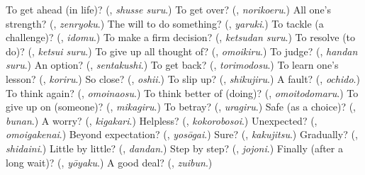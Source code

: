 \begin{tcolorbox}[breakable,colback=teal!4,colframe=teal!35!black,title={Before you move on}]
To get ahead (in life)? (\textbf{}, \emph{shusse suru}.) To get over? (\textbf{}, \emph{norikoeru}.) All one's strength? (\textbf{}, \emph{zenryoku}.) The will to do something? (\textbf{}, \emph{yaruki}.) To tackle (a challenge)? (\textbf{}, \emph{idomu}.) To make a firm decision? (\textbf{}, \emph{ketsudan suru}.) To resolve (to do)? (\textbf{}, \emph{ketsui suru}.) To give up all thought of? (\textbf{}, \emph{omoikiru}.) To judge? (\textbf{}, \emph{handan suru}.) An option? (\textbf{}, \emph{sentakushi}.) To get back? (\textbf{}, \emph{torimodosu}.) To learn one's lesson? (\textbf{}, \emph{koriru}.) So close? (\textbf{}, \emph{oshii}.) To slip up? (\textbf{}, \emph{shikujiru}.) A fault? (\textbf{}, \emph{ochido}.) To think again? (\textbf{}, \emph{omoinaosu}.) To think better of (doing)? (\textbf{}, \emph{omoitodomaru}.) To give up on (someone)? (\textbf{}, \emph{mikagiru}.) To betray? (\textbf{}, \emph{uragiru}.) Safe (as a choice)? (\textbf{}, \emph{bunan}.) A worry? (\textbf{}, \emph{kigakari}.) Helpless? (\textbf{}, \emph{kokorobosoi}.) Unexpected? (\textbf{}, \emph{omoigakenai}.) Beyond expectation? (\textbf{}, \emph{yosōgai}.) Sure? (\textbf{}, \emph{kakujitsu}.) Gradually? (\textbf{}, \emph{shidaini}.) Little by little? (\textbf{}, \emph{dandan}.) Step by step? (\textbf{}, \emph{jojoni}.) Finally (after a long wait)? (\textbf{}, \emph{yōyaku}.) A good deal? (\textbf{}, \emph{zuibun}.)
\end{tcolorbox}
